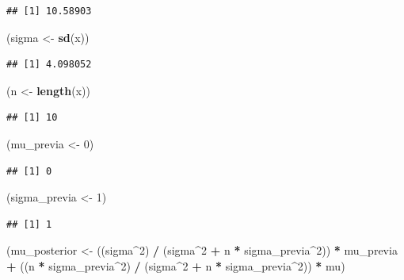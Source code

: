 \documentclass[
  12pt,
]{book}
\newenvironment{Shaded}{\begin{snugshade}}{\end{snugshade}}
\newcommand{\DecValTok}[1]{\textcolor[rgb]{0.00,0.00,0.81}{#1}}
\newcommand{\KeywordTok}[1]{\textcolor[rgb]{0.13,0.29,0.53}{\textbf{#1}}}
\newcommand{\NormalTok}[1]{#1}
\newcommand{\OperatorTok}[1]{\textcolor[rgb]{0.81,0.36,0.00}{\textbf{#1}}}
\newcommand{\StringTok}[1]{\textcolor[rgb]{0.31,0.60,0.02}{#1}}
\begin{document}
\begin{verbatim}
## [1] 10.58903
\end{verbatim}

\begin{Shaded}
\begin{Highlighting}[]
\NormalTok{(sigma \textless{}{-}}\StringTok{ }\KeywordTok{sd}\NormalTok{(x))}
\end{Highlighting}
\end{Shaded}

\begin{verbatim}
## [1] 4.098052
\end{verbatim}

\begin{Shaded}
\begin{Highlighting}[]
\NormalTok{(n \textless{}{-}}\StringTok{ }\KeywordTok{length}\NormalTok{(x))}
\end{Highlighting}
\end{Shaded}

\begin{verbatim}
## [1] 10
\end{verbatim}

\begin{Shaded}
\begin{Highlighting}[]
\NormalTok{(mu\_previa \textless{}{-}}\StringTok{ }\DecValTok{0}\NormalTok{)}
\end{Highlighting}
\end{Shaded}

\begin{verbatim}
## [1] 0
\end{verbatim}

\begin{Shaded}
\begin{Highlighting}[]
\NormalTok{(sigma\_previa \textless{}{-}}\StringTok{ }\DecValTok{1}\NormalTok{)}
\end{Highlighting}
\end{Shaded}

\begin{verbatim}
## [1] 1
\end{verbatim}

\begin{Shaded}
\begin{Highlighting}[]
\NormalTok{(mu\_posterior \textless{}{-}}\StringTok{ }\NormalTok{((sigma}\OperatorTok{\^{}}\DecValTok{2}\NormalTok{) }\OperatorTok{/}\StringTok{ }\NormalTok{(sigma}\OperatorTok{\^{}}\DecValTok{2} \OperatorTok{+}\StringTok{ }\NormalTok{n }\OperatorTok{*}\StringTok{ }\NormalTok{sigma\_previa}\OperatorTok{\^{}}\DecValTok{2}\NormalTok{)) }\OperatorTok{*}\StringTok{ }\NormalTok{mu\_previa }\OperatorTok{+}\StringTok{ }\NormalTok{((n }\OperatorTok{*}\StringTok{ }\NormalTok{sigma\_previa}\OperatorTok{\^{}}\DecValTok{2}\NormalTok{) }\OperatorTok{/}\StringTok{ }\NormalTok{(sigma}\OperatorTok{\^{}}\DecValTok{2} \OperatorTok{+}\StringTok{ }\NormalTok{n }\OperatorTok{*}\StringTok{ }\NormalTok{sigma\_previa}\OperatorTok{\^{}}\DecValTok{2}\NormalTok{)) }\OperatorTok{*}\StringTok{ }\NormalTok{mu)}
\end{Highlighting}
\end{Shaded}
\end{document}
